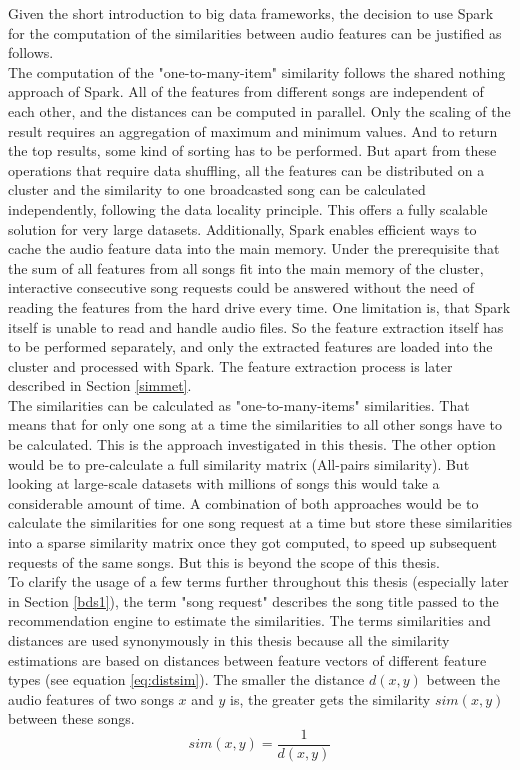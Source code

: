 Given the short introduction to big data frameworks, the decision to use Spark for the computation of the similarities between audio features can be justified as follows.\\
The computation of the "one-to-many-item" similarity follows the shared nothing approach of Spark. All of the features from different songs are independent of each other, and the distances can be computed in parallel. Only the scaling of the result requires an aggregation of maximum and minimum values. And to return the top results, some kind of sorting has to be performed. But apart from these operations that require data shuffling, all the features can be distributed on a cluster and the similarity to one broadcasted song can be calculated independently, following the data locality principle. This offers a fully scalable solution for very large datasets. Additionally, Spark enables efficient ways to cache the audio feature data into the main memory. Under the prerequisite that the sum of all features from all songs fit into the main memory of the cluster, interactive consecutive song requests could be answered without the need of reading the features from the hard drive every time.
One limitation is, that Spark itself is unable to read and handle audio files. So the feature extraction itself has to be performed separately, and only the extracted features are loaded into the cluster and processed with Spark. The feature extraction process is later described in Section \ref{simmet}.\\
The similarities can be calculated as "one-to-many-items" similarities. That means that for only one song at a time the similarities to all other songs have to be calculated. This is the approach investigated in this thesis. The other option would be to pre-calculate a full similarity matrix (All-pairs similarity). But looking at large-scale datasets with millions of songs this would take a considerable amount of time. A combination of both approaches would be to calculate the similarities for one song request at a time but store these similarities into a sparse similarity matrix once they got computed, to speed up subsequent requests of the same songs. But this is beyond the scope of this thesis.\\ 
To clarify the usage of a few terms further throughout this thesis (especially later in Section \ref{bds1}), the term "song request" describes the song title passed to the recommendation engine to estimate the similarities. The terms similarities and distances are used synonymously in this thesis because all the similarity estimations are based on distances between feature vectors of different feature types (see equation \eqref{eq:distsim}). The smaller the distance $d(x, y)$ between the audio features of two songs $x$ and $y$ is, the greater gets the similarity $sim(x, y)$ between these songs.\\
\begin{equation} \label{eq:distsim}
sim(x, y) = \frac{1}{d(x, y)}
\end{equation}

